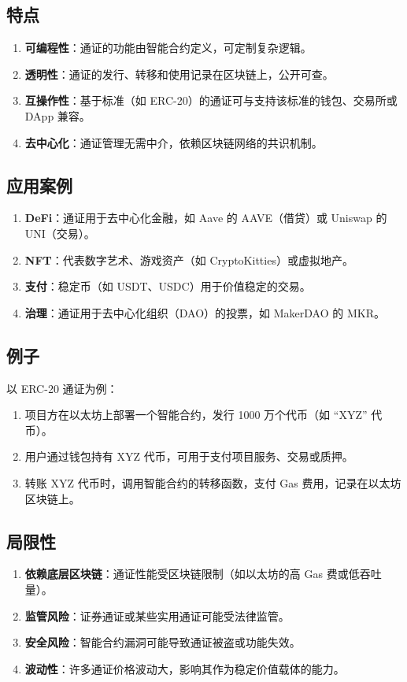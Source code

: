 \documentclass[12pt]{ctexart}
\begin{document}
\subsection{特点}
\begin{enumerate}
    \item \textbf{可编程性}：通证的功能由智能合约定义，可定制复杂逻辑。
    \item \textbf{透明性}：通证的发行、转移和使用记录在区块链上，公开可查。
    \item \textbf{互操作性}：基于标准（如 ERC-20）的通证可与支持该标准的钱包、交易所或 DApp 兼容。
    \item \textbf{去中心化}：通证管理无需中介，依赖区块链网络的共识机制。
\end{enumerate}

\subsection{应用案例}
\begin{enumerate}
    \item \textbf{DeFi}：通证用于去中心化金融，如 Aave 的 AAVE（借贷）或 Uniswap 的 UNI（交易）。
    \item \textbf{NFT}：代表数字艺术、游戏资产（如 CryptoKitties）或虚拟地产。
    \item \textbf{支付}：稳定币（如 USDT、USDC）用于价值稳定的交易。
    \item \textbf{治理}：通证用于去中心化组织（DAO）的投票，如 MakerDAO 的 MKR。
\end{enumerate}

\subsection{例子}
以 ERC-20 通证为例：
\begin{enumerate}
    \item 项目方在以太坊上部署一个智能合约，发行 1000 万个代币（如 “XYZ” 代币）。
    \item 用户通过钱包持有 XYZ 代币，可用于支付项目服务、交易或质押。
    \item 转账 XYZ 代币时，调用智能合约的转移函数，支付 Gas 费用，记录在以太坊区块链上。
\end{enumerate}

\subsection{局限性}
\begin{enumerate}
    \item \textbf{依赖底层区块链}：通证性能受区块链限制（如以太坊的高 Gas 费或低吞吐量）。
    \item \textbf{监管风险}：证券通证或某些实用通证可能受法律监管。
    \item \textbf{安全风险}：智能合约漏洞可能导致通证被盗或功能失效。
    \item \textbf{波动性}：许多通证价格波动大，影响其作为稳定价值载体的能力。
\end{enumerate}
\end{document}
